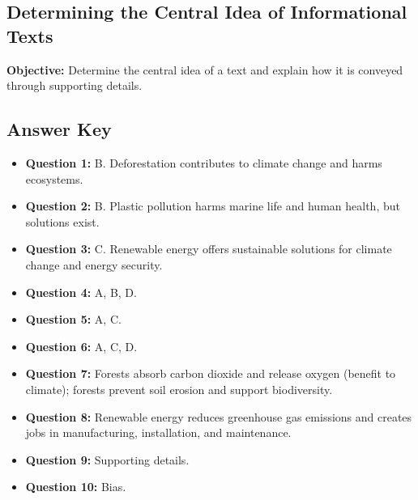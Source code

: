 \documentclass[12pt]{article}
\begin{document}
\subsection*{Determining the Central Idea of Informational Texts}
\onehalfspacing

\begin{tcolorbox}[colframe=black!40, colback=gray!0, title=Learning Objective]
\textbf{Objective:} Determine the central idea of a text and explain how it is conveyed through supporting details.
\end{tcolorbox}

\subsection*{Answer Key}

\begin{itemize}
    \item \textbf{Question 1:} B. Deforestation contributes to climate change and harms ecosystems.
    \item \textbf{Question 2:} B. Plastic pollution harms marine life and human health, but solutions exist.
    \item \textbf{Question 3:} C. Renewable energy offers sustainable solutions for climate change and energy security.
    \item \textbf{Question 4:} A, B, D.
    \item \textbf{Question 5:} A, C.
    \item \textbf{Question 6:} A, C, D.
    \item \textbf{Question 7:} Forests absorb carbon dioxide and release oxygen (benefit to climate); forests prevent soil erosion and support biodiversity.
    \item \textbf{Question 8:} Renewable energy reduces greenhouse gas emissions and creates jobs in manufacturing, installation, and maintenance.
    \item \textbf{Question 9:} Supporting details.
    \item \textbf{Question 10:} Bias.
\end{itemize}
\end{document}
